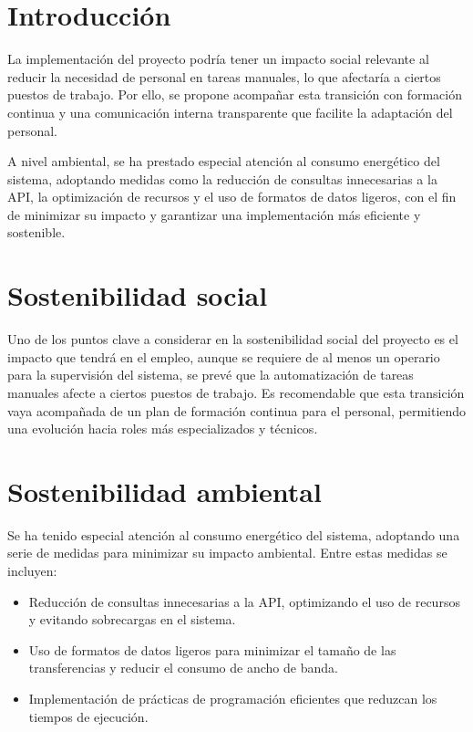 
\section{Introducción}

La implementación del proyecto podría tener un impacto social relevante al reducir la necesidad de personal en
tareas manuales, lo que afectaría a ciertos puestos de trabajo.
Por ello, se propone acompañar esta transición con formación continua y una comunicación interna transparente que
facilite la adaptación del personal.

A nivel ambiental, se ha prestado especial atención al consumo energético del sistema, adoptando medidas como la
reducción de consultas innecesarias a la API, la optimización de recursos y el uso de formatos de datos ligeros, con
el fin de minimizar su impacto y garantizar una implementación más eficiente y sostenible.

\section{Sostenibilidad social}

Uno de los puntos clave a considerar en la sostenibilidad social del proyecto es el impacto que tendrá en el empleo,
aunque se requiere de al menos un operario para la supervisión del sistema, se prevé que la automatización de tareas
manuales afecte a ciertos puestos de trabajo.
Es recomendable que esta transición vaya acompañada de un plan de formación continua para el personal, permitiendo una
evolución hacia roles más especializados y técnicos.

\section{Sostenibilidad ambiental}

Se ha tenido especial atención al consumo energético del sistema, adoptando una serie de medidas para minimizar su
impacto ambiental.
Entre estas medidas se incluyen:
\begin{itemize}
    \item Reducción de consultas innecesarias a la API, optimizando el uso de recursos y evitando sobrecargas en el
    sistema.
    \item Uso de formatos de datos ligeros para minimizar el tamaño de las transferencias y reducir el consumo de
    ancho de banda.
    \item Implementación de prácticas de programación eficientes que reduzcan los tiempos de ejecución.
\end{itemize}

